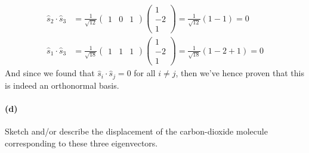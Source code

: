 \documentclass{article}
\begin{document}
\begin{solution}
\begin{align*}
		\hat{s}_2 \cdot \hat{s}_3 &= \frac{1}{\sqrt{12} }\begin{pmatrix} 1 & 0 & 1 \end{pmatrix} \begin{pmatrix} 1\\-2\\1 \end{pmatrix} = \frac{1}{\sqrt{12} }(1 - 1) = 0 \\
		\hat{s}_1 \cdot \hat{s}_3 &= \frac{1}{\sqrt{18} }\begin{pmatrix} 1 & 1 & 1 \end{pmatrix}	\begin{pmatrix} 1\\-2\\1 \end{pmatrix} = \frac{1}{\sqrt{18} }(1 - 2 + 1) = 0
	\end{align*} 
	And since we found that $\hat{s}_i \cdot \hat{s}_j = 0$ for all $i \neq j$, then we've hence proven that 
	this is indeed an orthonormal basis. 
\end{solution}

\paragraph{(d)}
Sketch and/or describe the displacement of the carbon-dioxide molecule corresponding to these three eigenvectors.
\end{document}
